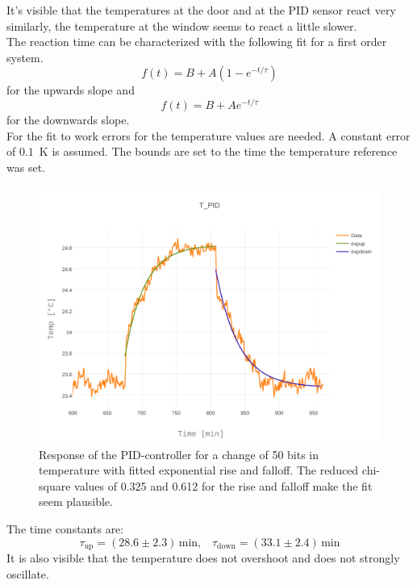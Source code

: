 \documentclass[12pt]{scrartcl}
\begin{document}
      It's visible that the temperatures at the door and at the PID sensor react
      very similarly, the temperature at the window seems to react a little
      slower.\\
      The reaction time can be characterized with the following fit for a first
      order system.
      \begin{equation*}
        f(t) = B + A(1-e^{-t/\tau})
      \end{equation*}
      for the upwards slope and
      \begin{equation*}
        f(t) = B + A e^{-t/\tau}
      \end{equation*}
      for the downwards slope. \\
      For the fit to work errors for the temperature values are needed.
      A constant error of $0.1$~K is assumed. The bounds are set to the time the
      temperature reference was set.
      \begin{figure}[H]
        \centering
        \includegraphics[width = \textwidth]{./plots/plot_image(12)}
        \caption{Response of the PID-controller for a change of 50 bits in
        temperature with fitted exponential rise and falloff. The reduced
        chi-square values of 0.325 and 0.612 for the rise and falloff
        make the fit seem plausible.}
        \label{fig13}
      \end{figure}
      The time constants are:
      $$\tau_{\text{up}} = (28.6 \pm 2.3) \,\text{min}, \;\;\; \tau_{\text{down}} =
      (33.1 \pm 2.4)\,\text{min}$$
      It is also visible that the temperature does not overshoot and does not
      strongly oscillate. \\\\
\end{document}
